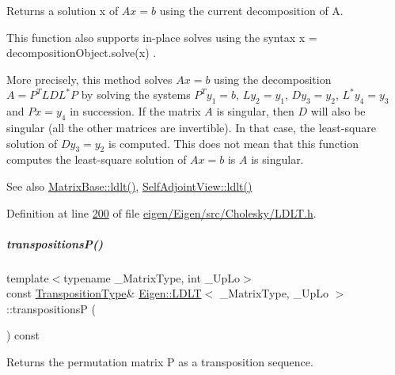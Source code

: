 \begin{DoxyReturn}{Returns}
a solution x of $ A x = b $ using the current decomposition of A.
\end{DoxyReturn}
This function also supports in-\/place solves using the syntax {\ttfamily x = decomposition\+Object.\+solve(x)} .

More precisely, this method solves $ A x = b $ using the decomposition $ A = P^T L D L^* P $ by solving the systems $ P^T y_1 = b $, $ L y_2 = y_1 $, $ D y_3 = y_2 $, $ L^* y_4 = y_3 $ and $ P x = y_4 $ in succession. If the matrix $ A $ is singular, then $ D $ will also be singular (all the other matrices are invertible). In that case, the least-\/square solution of $ D y_3 = y_2 $ is computed. This does not mean that this function computes the least-\/square solution of $ A x = b $ is $ A $ is singular.

\begin{DoxySeeAlso}{See also}
\hyperlink{group___core___module_a0ecf058a0727a4cab8b42d79e95072e1}{Matrix\+Base\+::ldlt()}, \hyperlink{group___core___module_a644155eef17b37c95d85b9f65bb49ac4}{Self\+Adjoint\+View\+::ldlt()} 
\end{DoxySeeAlso}


Definition at line \hyperlink{eigen_2_eigen_2src_2_cholesky_2_l_d_l_t_8h_source_l00200}{200} of file \hyperlink{eigen_2_eigen_2src_2_cholesky_2_l_d_l_t_8h_source}{eigen/\+Eigen/src/\+Cholesky/\+L\+D\+L\+T.\+h}.

\mbox{\label{group___cholesky___module_a47257d3500f9f7c9a4478158d0e34941}} 
\subparagraph{\texorpdfstring{transpositions\+P()}{transpositionsP()}\hspace{0.1cm}{\footnotesize\ttfamily [1/2]}}
{\footnotesize\ttfamily template$<$typename \+\_\+\+Matrix\+Type, int \+\_\+\+Up\+Lo$>$ \\
const \hyperlink{group___core___module}{Transposition\+Type}\& \hyperlink{group___cholesky___module_class_eigen_1_1_l_d_l_t}{Eigen\+::\+L\+D\+LT}$<$ \+\_\+\+Matrix\+Type, \+\_\+\+Up\+Lo $>$\+::transpositionsP (\begin{DoxyParamCaption}{ }\end{DoxyParamCaption}) const\hspace{0.3cm}{\ttfamily [inline]}}

\begin{DoxyReturn}{Returns}
the permutation matrix P as a transposition sequence. 
\end{DoxyReturn}


